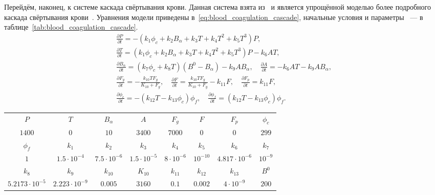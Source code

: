 Перейдём, наконец, к системе каскада свёртывания крови.
Данная система взята из~\cite{bouchnita2020mathematical, vassilevski2020parallel}
и является упрощённой моделью более подробного каскада свёртывания крови~\cite{panteleev2008coagulation, ushakova2018gemo}.
Уравнения модели приведены в~\eqref{eq:blood_coagulation_cascade}, начальные условия и параметры ~--- в таблице~\ref{tab:blood_coagulation_cascade}.
%
\begin{equation}
    \label{eq:blood_coagulation_cascade}
    \begin{aligned}
        \frac{\partial P}{\partial t} = - \left(k_1 \phi_c + k_2 B_\alpha + k_3 T + k_4 T^2 + k_5 T^3\right) P,
        \\
        \frac{\partial T}{\partial t} = \left(k_1 \phi_c + k_2 B_\alpha + k_3 T + k_4 T^2 + k_5 T^3 \right) P - k_6 A T,
        \\
        \frac{\partial B_\alpha}{\partial t} =  \left(k_7 \phi_c + k_8 T \right) \left( B^0 - B_\alpha \right) - k_9 A B_\alpha,
        \quad
        \frac{\partial A}{\partial t} = -k_6 A T - k_9 A B_\alpha,
        \\
        \frac{\partial F_g}{\partial t} = -\frac{k_{10} T F_g}{K_{10} + F_g},
        \quad
        \frac{\partial F}{\partial t} = \frac{k_{10} T F_g}{K_{10} + F_g} - k_{11} F,
        \quad
        \frac{\partial F_p} {\partial t} = k_{11} F,
        \\
        \frac{\partial \phi_c}{\partial t}  = - \left( k_{12} T - k_{13} \phi_c \right) \phi_f,
        \quad
        \frac{\partial \phi_f}{\partial t} = \left( k_{12} T - k_{13} \phi_c \right) \phi_f.
    \end{aligned}
\end{equation}

\begin{sidewaystable}[p!]
	\centering
	\begin{tabular}{cccccccc}
		\hline
		$ P $ & $ T $ & $ B_{\alpha} $ & $ A $ & $ F_g $ & $ F $ & $ F_p $ & $ \phi_c $  \\
		$ 1400 $ & $ 0 $ & $ 10 $ & $ 3400 $ & $ 7000 $ & $ 0 $ & $ 0 $ & $ 299 $  \\
		\hline
		 $ \phi_f $ & $ k_1 $ & $ k_2 $ & $ k_3 $ & $ k_4 $ & $ k_5 $ & $ k_6 $ & $ k_7 $   \\
		$ 1 $   & $ 1.5 \cdot 10^{-4} $ & $ 7.5 \cdot 10^{-6} $ & $ 1.5 \cdot 10^{-5} $ & $ 8 \cdot 10^{-6} $ & $ 10^{-10} $ & $ 4.817 \cdot 10^{-6} $ & $ 10^{-9} $ \\
		\hline
		$ k_8 $ & $ k_9 $ & $ k_{10} $ & $ K_{10} $ & $ k_{11} $ & $ k_{12} $ & $ k_{13} $ & $ B^0 $ \\
		 $ 5.2173 \cdot 10^{-5} $  & $ 2.223 \cdot 10^{-9} $ & $ 0.005 $ & $ 3160 $ & $ 0.1 $ & $ 0.002 $ & $ 4 \cdot 10^{-9} $ & $ 200 $ \\
		\hline
	\end{tabular}
    \caption{Начальные условия и параметры модели (каскад свёртывания крови).}
	\label{tab:blood_coagulation_cascade}
\end{sidewaystable}

